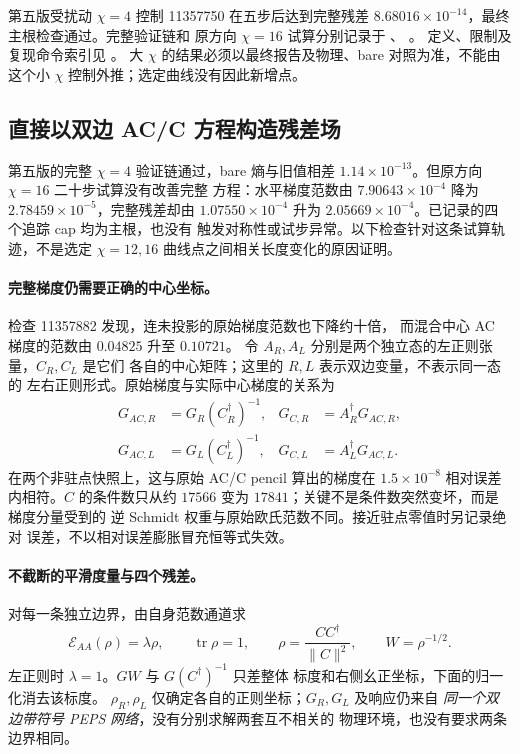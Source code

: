 第五版受扰动 $\chi=4$ 控制 11357750 在五步后达到完整残差
$8.68016\times10^{-14}$，最终主根检查通过。完整验证链和
原方向 $\chi=16$ 试算分别记录于
、
。
定义、限制及复现命令索引见 。
大 $\chi$ 的结果必须以最终报告及物理、bare 对照为准，不能由
这个小 $\chi$ 控制外推；选定曲线没有因此新增点。

\subsection{直接以双边 AC/C 方程构造残差场}
第五版的完整 $\chi=4$ 验证链通过，bare 熵与旧值相差
$1.14\times10^{-13}$。但原方向 $\chi=16$ 二十步试算没有改善完整
方程：水平梯度范数由 $7.90643\times10^{-4}$ 降为
$2.78459\times10^{-5}$，完整残差却由 $1.07550\times10^{-4}$
升为 $2.05669\times10^{-4}$。已记录的四个追踪 cap 均为主根，也没有
触发对称性或试步异常。以下检查针对这条试算轨迹，不是选定
$\chi=12,16$ 曲线点之间相关长度变化的原因证明。

\paragraph{完整梯度仍需要正确的中心坐标。}
检查 11357882 发现，连未投影的原始梯度范数也下降约十倍，
而混合中心 AC 梯度的范数由 $0.04825$ 升至 $0.10721$。
令 $A_R,A_L$ 分别是两个独立态的左正则张量，$C_R,C_L$ 是它们
各自的中心矩阵；这里的 $R,L$ 表示双边变量，不表示同一态的
左右正则形式。原始梯度与实际中心梯度的关系为
\begin{align}
 G_{AC,R}&=G_R(C_R^\dagger)^{-1},&
 G_{C,R}&=A_R^\dagger G_{AC,R},\\
 G_{AC,L}&=G_L(C_L^\dagger)^{-1},&
 G_{C,L}&=A_L^\dagger G_{AC,L}.
\end{align}
在两个非驻点快照上，这与原始 AC/C pencil 算出的梯度在
$1.5\times10^{-8}$ 相对误差内相符。$C$ 的条件数只从约 $17566$
变为 $17841$；关键不是条件数突然变坏，而是梯度分量受到的
逆 Schmidt 权重与原始欧氏范数不同。接近驻点零值时另记录绝对
误差，不以相对误差膨胀冒充恒等式失效。

\paragraph{不截断的平滑度量与四个残差。}
对每一条独立边界，由自身范数通道求
\begin{equation}
 \mathcal E_{AA}(\rho)=\lambda\rho,\qquad
 \operatorname{tr}\rho=1,\qquad
 \rho=\frac{CC^\dagger}{\|C\|^2},\qquad W=\rho^{-1/2}.
\end{equation}
左正则时 $\lambda=1$。$GW$ 与 $G(C^\dagger)^{-1}$ 只差整体
标度和右侧幺正坐标，下面的归一化消去该标度。
$\rho_R,\rho_L$ 仅确定各自的正则坐标；$G_R,G_L$ 及响应仍来自
\emph{同一个双边带符号 PEPS 网络}，没有分别求解两套互不相关的
物理环境，也没有要求两条边界相同。

